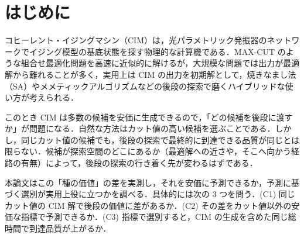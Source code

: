 \section{はじめに}\label{sec:intro}

コヒーレント・イジングマシン（CIM）は，光パラメトリック発振器のネットワークでイジング模型の基底状態を探す物理的な計算機である\cite{wang2013,inagaki2016,mcmahon2016}．MAX-CUT のような組合せ最適化問題を高速に近似的に解けるが，大規模な問題では出力が最適解から離れることが多く，実用上は CIM の出力を初期解として，焼きなまし法（SA）\cite{kirkpatrick1983}やメメティックアルゴリズム\cite{wu2012}などの後段の探索で磨くハイブリッドな使い方が考えられる．

このとき CIM は多数の候補を安価に生成できるので，「どの候補を後段に渡すか」が問題になる．自然な方法はカット値の高い候補を選ぶことである．しかし，同じカット値の候補でも，後段の探索で最終的に到達できる品質が同じとは限らない．候補が探索空間のどこにあるか（最適解への近さや，そこへ向かう経路の有無）によって，後段の探索の行き着く先が変わるはずである．

本論文はこの「種の価値」の差を実測し，それを安価に予測できるか，予測に基づく選別が実用上役に立つかを調べる．具体的には次の 3 つを問う．(C1) 同じカット値の CIM 解で後段の価値に差があるか．(C2) その差をカット値以外の安価な指標で予測できるか．(C3) 指標で選別すると，CIM の生成を含めた同じ総時間で到達品質が上がるか．

